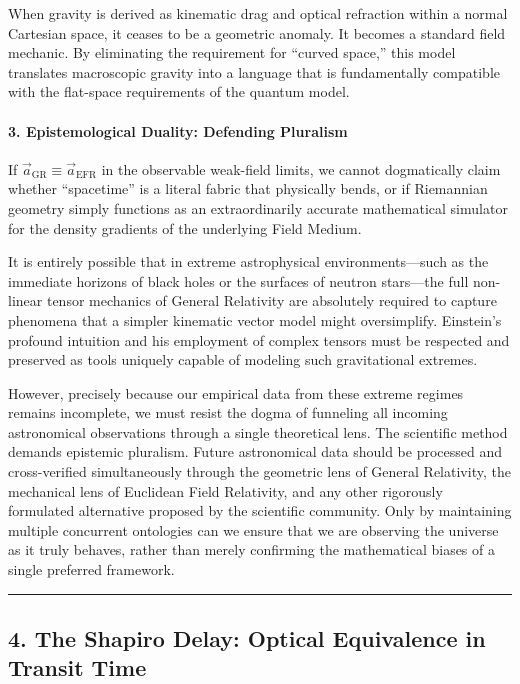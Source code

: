 \documentclass[
]{article}
\begin{document}
When gravity is derived as kinematic drag and optical refraction within
a normal Cartesian space, it ceases to be a geometric anomaly. It
becomes a standard field mechanic. By eliminating the requirement for
``curved space,'' this model translates macroscopic gravity into a
language that is fundamentally compatible with the flat-space
requirements of the quantum model.

\paragraph{3. Epistemological Duality: Defending
Pluralism}\label{epistemological-duality-defending-pluralism}

If \(\vec{a}_{\text{GR}} \equiv \vec{a}_{\text{EFR}}\) in the observable
weak-field limits, we cannot dogmatically claim whether ``spacetime'' is
a literal fabric that physically bends, or if Riemannian geometry simply
functions as an extraordinarily accurate mathematical simulator for the
density gradients of the underlying Field Medium.

It is entirely possible that in extreme astrophysical
environments---such as the immediate horizons of black holes or the
surfaces of neutron stars---the full non-linear tensor mechanics of
General Relativity are absolutely required to capture phenomena that a
simpler kinematic vector model might oversimplify. Einstein's profound
intuition and his employment of complex tensors must be respected and
preserved as tools uniquely capable of modeling such gravitational
extremes.

However, precisely because our empirical data from these extreme regimes
remains incomplete, we must resist the dogma of funneling all incoming
astronomical observations through a single theoretical lens. The
scientific method demands epistemic pluralism. Future astronomical data
should be processed and cross-verified simultaneously through the
geometric lens of General Relativity, the mechanical lens of Euclidean
Field Relativity, and any other rigorously formulated alternative
proposed by the scientific community. Only by maintaining multiple
concurrent ontologies can we ensure that we are observing the universe
as it truly behaves, rather than merely confirming the mathematical
biases of a single preferred framework.

\begin{center}\rule{0.5\linewidth}{0.5pt}\end{center}

\subsection{4. The Shapiro Delay: Optical Equivalence in Transit
Time}\label{the-shapiro-delay-optical-equivalence-in-transit-time}
\end{document}
